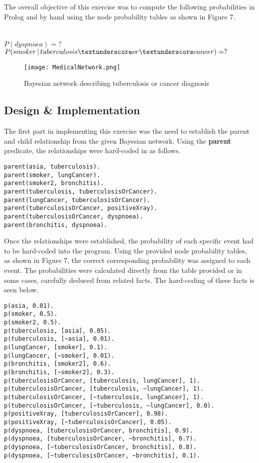 \documentclass[11pt]{article}
\newcommand{\forceindent}{\leavevmode{\parindent=1em\indent}}
\begin{document}
\forceindent The overall objective of this exercise was to compute the following probabilities in Prolog and by hand using the node probability tables as shown in Figure 7. \\
\\
\\
$P(dyspnoea) = ?$ \\
$P(smoker\,|\,tuberculosis \textunderscore or \textunderscore cancer) = ?$\\

\begin{figure}[h!]
  \centering
{\texttt{[image: MedicalNetwork.png]}}
    \caption{Bayesian network describing tuberculosis or cancer diagnosis}
\end{figure}

\subsection{Design \& Implementation}

\forceindent The first part in implementing this exercise was the need to establish the parent and child relationship from the given Bayesian network. Using the \textbf{parent} predicate, the relationships were hard-coded in as follows.

\begin{lstlisting}
parent(asia, tuberculosis).    				 
parent(smoker, lungCancer).    				 
parent(smoker2, bronchitis).   				
parent(tuberculosis, tuberculosisOrCancer).  
parent(lungCancer, tuberculosisOrCancer).    
parent(tuberculosisOrCancer, positiveXray).  
parent(tuberculosisOrCancer, dyspnoea).      
parent(bronchitis, dyspnoea).		    	 
\end{lstlisting}
\vspace{0.5cm}
\forceindent Once the relationships were established, the probability of each specific event had to be hard-coded into the program. Using the provided node probability tables, as shown in Figure 7, the correct corresponding probability was assigned to each event. The probabilities were calculated directly from the table provided or in some cases, carefully deduced from related facts. The hard-coding of these facts is seen below.

\begin{lstlisting}
p(asia, 0.01).
p(smoker, 0.5).
p(smoker2, 0.5).
p(tuberculosis, [asia], 0.05).
p(tuberculosis, [~asia], 0.01).
p(lungCancer, [smoker], 0.1).
p(lungCancer, [~smoker], 0.01).
p(bronchitis, [smoker2], 0.6).
p(bronchitis, [~smoker2], 0.3).
p(tuberculosisOrCancer, [tuberculosis, lungCancer], 1).
p(tuberculosisOrCancer, [tuberculosis, ~lungCancer], 1).
p(tuberculosisOrCancer, [~tuberculosis, lungCancer], 1).
p(tuberculosisOrCancer, [~tuberculosis, ~lungCancer], 0.0).
p(positiveXray, [tuberculosisOrCancer], 0.98).
p(positiveXray, [~tuberculosisOrCancer], 0.05).
p(dyspnoea, [tuberculosisOrCancer, bronchitis], 0.9).
p(dyspnoea, [tuberculosisOrCancer, ~bronchitis], 0.7).
p(dyspnoea, [~tuberculosisOrCancer, bronchitis], 0.8).
p(dyspnoea, [~tuberculosisOrCancer, ~bronchitis], 0.1).
\end{lstlisting}
\end{document}
